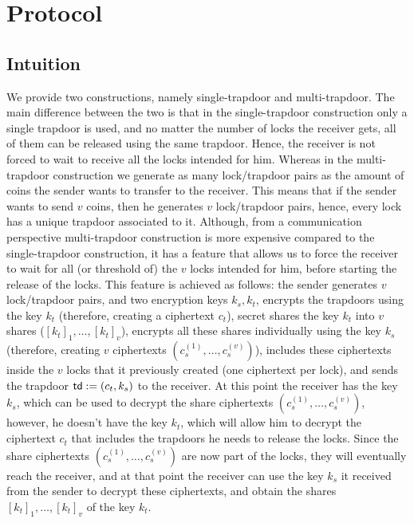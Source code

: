 \section{Protocol}


\subsection{Intuition}

We provide two constructions, namely single-trapdoor and multi-trapdoor. The main difference 
between the two is that in the single-trapdoor construction only a single trapdoor is used, and 
no matter the number of locks the receiver gets, all of them can be released using the same 
trapdoor. Hence, the receiver is not forced to wait to receive all the locks intended for him. 
Whereas in the multi-trapdoor construction we generate as many lock/trapdoor pairs as the amount 
of coins the sender wants to transfer to the receiver. This means that if the sender wants to 
send $v$ coins, then he generates $v$ lock/trapdoor pairs, hence, every lock has a unique 
trapdoor associated to it. Although, from a communication perspective multi-trapdoor 
construction is more expensive compared to the single-trapdoor construction, it has a feature 
that allows us to force the receiver to wait for all (or threshold of) the $v$ locks intended for 
him, before starting the release of the locks. This feature is achieved as follows: the sender 
generates $v$ lock/trapdoor pairs, and two encryption keys $k_s, k_t$, encrypts the trapdoors 
using the key $k_t$ (therefore, creating a ciphertext $c_t$), secret shares the key $k_t$ into 
$v$ shares ($[k_t]_1,\ldots,[k_t]_v$), encrypts all these shares individually using the key $k_s$ 
(therefore, creating $v$ ciphertexts $(c_s^{(1)},\ldots,c_s^{(v)})$), includes these ciphertexts 
inside the $v$ locks that it previously created (one ciphertext per lock), and sends the 
trapdoor $\mathsf{td} := (c_t, k_s)$ to the receiver. At this point the receiver has the key $k_s$, 
which can be used to decrypt the share ciphertexts $(c_s^{(1)},\ldots,c_s^{(v)})$, however, he 
doesn't have the key $k_t$, which will allow him to decrypt the ciphertext $c_t$ that includes 
the trapdoors he needs to release the locks. Since the share ciphertexts $(c_s^{(1)},
\ldots,c_s^{(v)})$ are now part of the locks, they will eventually reach the receiver, and at 
that point the receiver can use the key $k_s$ it received from the sender to decrypt these 
ciphertexts, and obtain the shares $[k_t]_1,\ldots,[k_t]_v$ of the key $k_t$. 

